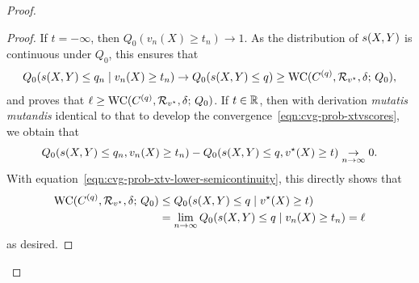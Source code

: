 \begin{proof}
\begin{proof}
    If $t = - \infty$, then $Q_0( v_n(X) \ge t_n) \to 1$.  As the
    distribution of $s(X,Y)$ is continuous under $Q_0$, this ensures
    that
    \begin{align*}
      Q_0( s(X,Y) \le q_n \mid v_n(X) \ge t_n )\to Q_0( s(X,Y) \le q) \ge \textup{WC}(C^{(q)}, \mathcal{R}_{v^\star}, \delta; \, Q_0),
    \end{align*}
    and proves that $\ell \ge \textup{WC}(C^{(q)}, \mathcal{R}_{v^\star}, \delta; \, Q_0)$.  If
    $t \in \mathbb{R}$, then with derivation \emph{mutatis mutandis} identical to
    that to develop the convergence~\eqref{eqn:cvg-prob-xtvscores}, we
    obtain that
    \begin{align*}
      Q_0( s(X,Y) \le q_n,  v_n(X) \ge t_n)  - Q_0( s(X,Y) \le q,  v^\star(X) \ge t) \underset{n \to \infty}{\rightarrow} 0.
    \end{align*}
    With equation~\eqref{eqn:cvg-prob-xtv-lower-semicontinuity}, this directly
    shows that
    \begin{align*}
      \textup{WC}(C^{(q)}, \mathcal{R}_{v^\star}, \delta; \, Q_0)
      &\le Q_0( s(X,Y) \le q \mid v^\star(X) \ge t)  \\
      &= \lim_{n \to \infty} Q_0( s(X,Y) \le q \mid v_n(X) \ge t_n) = \ell
    \end{align*}
    as desired.
  \end{proof}
  

\end{proof}
